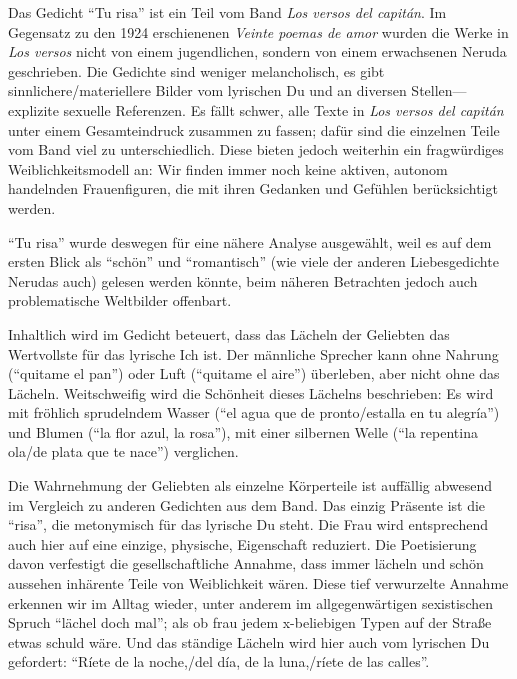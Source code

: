 Das Gedicht ``Tu risa'' ist ein Teil vom Band \textit{Los versos del capitán}.
Im Gegensatz zu den 1924 erschienenen \textit{Veinte poemas de amor} wurden die Werke in \textit{Los versos} nicht von einem jugendlichen, sondern von einem erwachsenen Neruda geschrieben.
Die Gedichte sind weniger melancholisch, es gibt sinnlichere/materiellere Bilder vom lyrischen Du und an diversen Stellen—explizite sexuelle Referenzen.
Es fällt schwer, alle Texte in \textit{Los versos del capitán} unter einem Gesamteindruck zusammen zu fassen;
dafür sind die einzelnen Teile vom Band viel zu unterschiedlich.
Diese bieten jedoch weiterhin ein fragwürdiges Weiblichkeitsmodell an:
Wir finden immer noch keine aktiven, autonom handelnden Frauenfiguren, die mit ihren Gedanken und Gefühlen berücksichtigt werden.

``Tu risa'' wurde deswegen für eine nähere Analyse ausgewählt, weil es auf dem ersten Blick als ``schön'' und ``romantisch'' (wie viele der anderen Liebesgedichte Nerudas auch) gelesen werden könnte, %
beim näheren Betrachten jedoch auch problematische Weltbilder offenbart.

Inhaltlich wird im Gedicht beteuert, dass das Lächeln der Geliebten das Wertvollste für das lyrische Ich ist.
Der männliche Sprecher kann ohne Nahrung (``quitame el pan'') oder Luft (``quitame el aire'') überleben, aber nicht ohne das Lächeln.
Weitschweifig wird die Schönheit dieses Lächelns beschrieben:
Es wird mit fröhlich sprudelndem Wasser (``el agua que de pronto/estalla en tu alegría'') und Blumen (``la flor azul, la rosa''), mit einer silbernen Welle (``la repentina ola/de plata que te nace'') verglichen.

Die Wahrnehmung der Geliebten als einzelne Körperteile ist auffällig abwesend im Vergleich zu anderen Gedichten aus dem Band.
Das einzig Präsente ist die ``risa'', die metonymisch für das lyrische Du steht.
Die Frau wird entsprechend auch hier auf eine einzige, physische, Eigenschaft reduziert.
Die Poetisierung davon verfestigt die gesellschaftliche Annahme, dass immer lächeln und schön aussehen inhärente Teile von Weiblichkeit wären.
Diese tief verwurzelte Annahme erkennen wir im Alltag wieder, unter anderem im allgegenwärtigen sexistischen Spruch ``lächel doch mal''; als ob frau jedem x-beliebigen Typen auf der Straße etwas schuld wäre.
Und das ständige Lächeln wird hier auch vom lyrischen Du gefordert: ``Ríete de la noche,/del día, de la luna,/ríete de las calles''.

